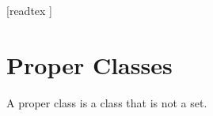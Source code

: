 \documentclass[10pt]{article}
\begin{document}
  \begin{imports}
    \begin{forthel}
      [readtex ]
    \end{forthel}
  \end{imports}


  \section*{Proper Classes}

  \begin{forthel}
    \begin{definition}
      A proper class is a class that is not a set.
    \end{definition}
  \end{forthel}
\end{document}
